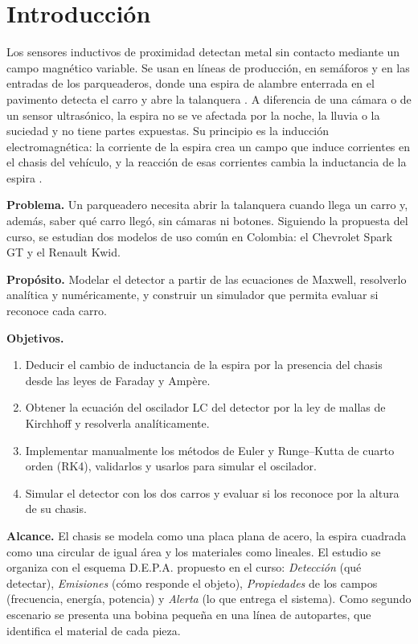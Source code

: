 \documentclass[10pt,onecolumn]{article}
\numberwithin{equation}{section}
\numberwithin{figure}{section}
\numberwithin{table}{section}
\begin{document}

\section{Introducción}

Los sensores inductivos de proximidad detectan metal sin contacto mediante un campo magnético variable. Se usan en
líneas de producción, en semáforos y en las entradas de los parqueaderos, donde una espira de alambre enterrada en
el pavimento detecta el carro y abre la talanquera \cite{fhwa2006,klein2006}. A diferencia de una cámara o de un
sensor ultrasónico, la espira no se ve afectada por la noche, la lluvia o la suciedad y no tiene partes expuestas.
Su principio es la inducción electromagnética: la corriente de la espira crea un campo que induce corrientes en el
chasis del vehículo, y la reacción de esas corrientes cambia la inductancia de la espira
\cite{griffiths2017,libby1971}.

\textbf{Problema.} Un parqueadero necesita abrir la talanquera cuando llega un carro y, además, saber qué carro
llegó, sin cámaras ni botones. Siguiendo la propuesta del curso, se estudian dos modelos de uso común en Colombia:
el Chevrolet Spark GT y el Renault Kwid.

\textbf{Propósito.} Modelar el detector a partir de las ecuaciones de Maxwell, resolverlo analítica y
numéricamente, y construir un simulador que permita evaluar si reconoce cada carro.

\textbf{Objetivos.}
\begin{enumerate}
 \item Deducir el cambio de inductancia de la espira por la presencia del chasis desde las leyes de Faraday y
       Ampère.
 \item Obtener la ecuación del oscilador LC del detector por la ley de mallas de Kirchhoff y resolverla
       analíticamente.
 \item Implementar manualmente los métodos de Euler y Runge--Kutta de cuarto orden (RK4), validarlos y usarlos
       para simular el oscilador.
 \item Simular el detector con los dos carros y evaluar si los reconoce por la altura de su chasis.
\end{enumerate}

\textbf{Alcance.} El chasis se modela como una placa plana de acero, la espira cuadrada como una circular de igual
área y los materiales como lineales. El estudio se organiza con el esquema D.E.P.A. propuesto en el curso:
\emph{Detección} (qué detectar), \emph{Emisiones} (cómo responde el objeto), \emph{Propiedades} de los campos
(frecuencia, energía, potencia) y \emph{Alerta} (lo que entrega el sistema). Como segundo escenario se presenta una
bobina pequeña en una línea de autopartes, que identifica el material de cada pieza.
\end{document}
